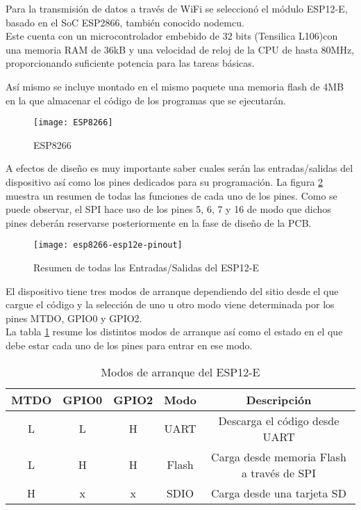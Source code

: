 Para la transmisión de datos a través de WiFi se seleccionó el módulo ESP12-E, basado en el \Gls{SoC} ESP2866, también conocido nodemcu.
\\Este cuenta con un microcontrolador embebido de 32 bits (Tensilica L106)con una memoria \Gls{RAM} de 36kB y una velocidad de reloj de la \Gls{CPU} de hasta 80MHz, proporcionando suficiente potencia para las tareas básicas.

Así mismo se incluye montado en el mismo paquete una memoria flash de 4MB en la que almacenar el código de los programas que se ejecutarán. 

\begin{figure} [h]
    \centering
    \texttt{[image: ESP8266]}
    \caption{ESP8266}
    \label{fig:ESP8266}
\end{figure}

A efectos de diseño es muy importante saber cuales serán las entradas/salidas del dispositivo así como los pines dedicados para su programación. La figura \ref{fig:ESP8266_pinout} muestra un resumen de todas las funciones de cada uno de los pines. Como se puede observar, el SPI hace uso de los pines 5, 6, 7 y 16 de modo que dichos pines deberán reservarse posteriormente en la fase de diseño de la \Gls{PCB}.

\begin{figure} [h]
    \centering
    \texttt{[image: esp8266-esp12e-pinout]}
    \caption{Resumen de todas las Entradas/Salidas del ESP12-E}
    \label{fig:ESP8266_pinout}
\end{figure}

El dispositivo tiene tres modos de arranque dependiendo del sitio desde el que cargue el código y la selección de uno u otro modo viene determinada por los pines MTDO, GPIO0 y GPIO2. \\La tabla \ref{tab:ESP_Boot_Modes} resume los distintos modos de arranque así como el estado en el que debe estar cada uno de los pines para entrar en ese modo.
\begin{table} [h]
 	\centering
	\begin{tabular}{|c|c|c|c|c|}
		\hline 
		MTDO & GPIO0 & GPIO2 & Modo & Descripción \\ 
		\hline 
		L & L & H & UART & Descarga el código desde UART \\ 
		\hline 
		L & H & H & Flash & Carga desde memoria Flash a través de SPI \\ 
		\hline 
		H & x & x & SDIO & Carga desde una tarjeta SD \\ 
		\hline 
	\end{tabular} 
	\caption{Modos de arranque del ESP12-E}
    \label{tab:ESP_Boot_Modes}
\end{table}	

